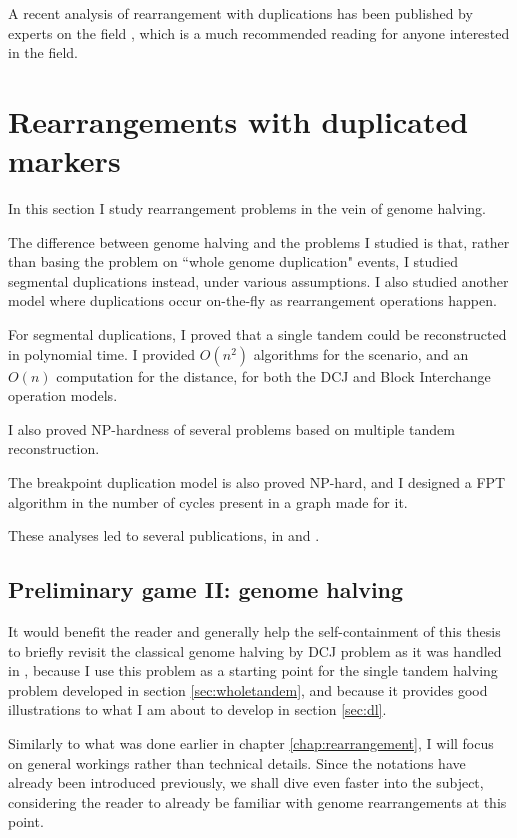 \documentclass[11pt,final,twoside,nofrench]{thlifl}
\begin{document}
A recent analysis of rearrangement with duplications has been published by experts on the field \cite{ES12}, which is a much recommended reading for anyone interested in the field.

\chapter[Rearrangements with duplicated markers]{Rearrangements with duplicated markers}

In this section I study rearrangement problems in the vein of genome halving.

The difference between genome halving and the problems I studied is that, rather than basing the problem on ``whole genome duplication" events, I studied segmental duplications instead, under various assumptions. I also studied another model where duplications occur on-the-fly as rearrangement operations happen.

For segmental duplications, I proved that a single tandem could be reconstructed in polynomial time. I provided $O(n^2)$ algorithms for the scenario, and an $O(n)$ computation for the distance, for both the DCJ and Block Interchange operation models.

I also proved NP-hardness of several problems based on multiple tandem reconstruction.

The breakpoint duplication model is also proved NP-hard, and I designed a FPT algorithm in the number of cycles present in a graph made for it.

These analyses led to several publications, in \cite{Thomas11} \cite{Thomas13pre} \cite{Thomas12} and \cite{Thomas13}.
 \section[Preliminary game II: genome halving]{Preliminary game II: genome halving}
\label{halvingrevisit}
It would benefit the reader and generally help the self-containment of this thesis to briefly revisit the classical genome halving by DCJ problem as it was handled in \cite{Mixtacki08}, because I use this problem as a starting point for the single tandem halving problem developed in section \ref{sec:wholetandem}, and because it provides good illustrations to what I am about to develop in section \ref{sec:dl}.

Similarly to what was done earlier in chapter \ref{chap:rearrangement}, I will focus on general workings rather than technical details. Since the notations have already been introduced previously, we shall dive even faster into the subject, considering the reader to already be familiar with genome rearrangements at this point.
\end{document}
